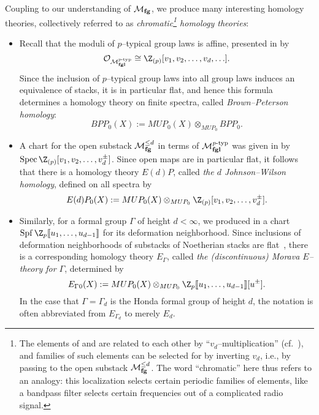 \begin{definition}\label{DefnChromaticHomologyThys}
Coupling  to our understanding of \(\mathcal{M}_{\mathbf{fg}}\), we produce many interesting homology theories, collectively referred to as \textit{chromatic\footnote{The elements of  and  are related to each other by ``\(v_d\)--multiplication'' (cf.\ ), and families of such elements can be selected for by inverting \(v_d\), i.e., by passing to the open substack \(\mathcal{M}_{\mathbf{fg}}^{\le d}\).  The word ``chromatic'' here thus refers to an analogy: this localization selects certain periodic families of elements, like a bandpass filter selects certain frequencies out of a complicated radio signal.} homology theories}:
\begin{itemize}
\item Recall that the moduli of \(p\)--typical group laws is affine, presented in  by \[\sheaf O_{\moduli{fgl}^{\ptyp}} \cong \Z_{(p)}[v_1, v_2, \ldots, v_d, \ldots].\]  Since the inclusion of \(p\)--typical group laws into all group laws induces an equivalence of stacks, it is in particular flat, and hence this formula determines a homology theory on finite spectra, called \textit{Brown--Peterson homology}: \[BPP_0(X) := MUP_0(X) \otimes_{MUP_0} BPP_0.\]
\item A chart for the open substack \(\mathcal{M}_{\mathbf{fg}}^{\le d}\) in terms of \(\mathcal{M}_{\mathbf{fgl}}^{\mathit{p}\text{-}\mathrm{typ}}\) was given in  by \(\Spec \Z_{(p)}[v_1, v_2, \ldots, v_d^\pm]\).  Since open maps are in particular flat, it follows that there is a homology theory \(E(d)P\), called \textit{the \(d\){\th} Johnson--Wilson homology}, defined on all spectra by \[E(d)P_0(X) := MUP_0(X) \otimes_{MUP_0} \Z_{(p)}[v_1, v_2, \ldots, v_d^\pm].\]
\item Similarly, for a formal group \(\Gamma\) of height \(d < \infty\), we produced in  a chart \(\Spf \Z_p\ps{u_1, \ldots, u_{d-1}}\) for its deformation neighborhood.  Since inclusions of deformation neighborhoods of substacks of Noetherian stacks are flat~\cite{Matsumura}, there is a corresponding homology theory \(E_\Gamma{}\), called \textit{the (discontinuous) Morava \(E\)--theory for \(\Gamma\)}, determined by \[E_\Gamma{}_0(X) := MUP_0(X) \otimes_{MUP_0} \Z_p\ps{u_1, \ldots, u_{d-1}}[u^\pm].\]  In the case that \(\Gamma = \Gamma_d\) is the Honda formal group of height \(d\), the notation is often abbreviated from \(E_{\Gamma_d}\) to merely \(E_d\).

\end{itemize}
\end{definition}
